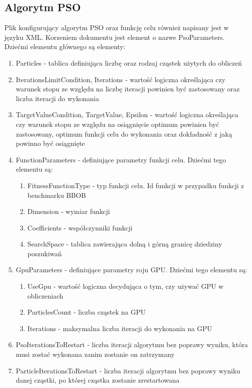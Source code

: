 \documentclass[12pt, twoside, openany, abstract=on]{report}
\theoremstyle{definition}
\begin{document}
\subsection{Algorytm PSO}
Plik konfigurujący algorytm PSO oraz funkcję celu również napisany jest w języku XML. Korzeniem dokumentu jest element o nazwe PsoParameters. 
Dziećmi elementu głównego są elementy:
\begin{enumerate}
	\item Particles - tablica definiująca liczbę oraz rodzaj cząstek użytych do obliczeń
	\item IterationsLimitCondition, Iterations - wartość logiczna określająca czy warunek stopu ze względu na liczbę iteracji powinien być zastosowany oraz liczba iteracji do wykonania
	\item TargetValueCondition, TargetValue, Epsilon - wartość logiczna określająca czy warunek stopu ze względu na osiągnięcie optimum powinien być zastosowany, optimum funkcji celu do wykonania oraz dokładność z jaką powinno być osiągnięte
	\item FunctionParameters - definiujące parametry funkcji celu. Dziećmi tego elementu są:
	\begin{enumerate}
		\item FitnessFunctionType - typ funkcji celu. Id funkcji w przypadku funkcji z benchmarku BBOB
		\item Dimension - wymiar funkcji
		\item Coefficients - współczynniki funkcji
		\item SearchSpace - tablica zawierająca dolną i górną granicę dziedziny poszukiwań
	\end{enumerate}
	\item GpuParameters - definiujące parametry roju GPU. Dziećmi tego elementu są:
	\begin{enumerate}
		\item UseGpu - wartość logiczna decydująca o tym, czy używać GPU w obliczeniach
		\item ParticlesCount - liczba cząstek na GPU
		\item Iterations - maksymalna liczba iteracji do wykonania na GPU
	\end{enumerate}
	\item PsoIterationsToRestart - liczba iteracji algorytmu bez poprawy wyniku, która musi zostać wykonana zanim zostanie on zatrzymany
	\item ParticleIterationsToRestart - liczba iteracji algorytmu bez poprawy wyniku danej cząstki, po której cząstka zostanie zrestartowana

\end{enumerate}
\end{document}
